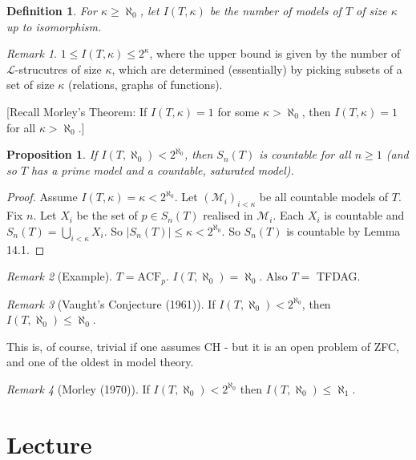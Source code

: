 \documentclass[]{article}
\theoremstyle{custhm}
\theoremstyle{cusdef}
\newtheorem{defin}[theorem]{Definition}
\theoremstyle{custhm}
\theoremstyle{custhm}
\theoremstyle{custhm}
\newtheorem{prop}[theorem]{Proposition}
\theoremstyle{ex}
\theoremstyle{custhm}
\theoremstyle{cusdef}
\theoremstyle{remark}
\newtheorem*{remark*}{Remark}
\theoremstyle{remark}
\renewcommand{\L}{\mathcal{L}}
\newcommand{\M}{\mathcal{M}}
\newcommand{\acf}{\textrm{ACF}}
\begin{document}
\begin{defin}
	For $\kappa \ge \aleph_0$, let $I(T,\kappa)$ be the number of models of $T$ of size $\kappa$ up to isomorphism.
\end{defin}
\begin{remark*}
	$1 \le I(T,\kappa) \le 2^\kappa$, where the upper bound is given by the number of $\L$-strucutres of size $\kappa$, which are determined (essentially) by picking subsets of a set of size $\kappa$ (relations, graphs of functions).

	[Recall Morley's Theorem: If $I(T,\kappa) =1 $ for some $\kappa > \aleph_0$, then $I(T,\kappa) = 1$ for all $\kappa > \aleph_0$.]
\end{remark*}
\begin{prop}
	If $I(T,\aleph_0) < 2^{\aleph_0}$, then $S_n(T)$ is countable for all $n\ge 1$ (and so $T$ has a prime model and a countable, saturated model).
\end{prop}
\begin{proof}
	Assume $I(T,\kappa) = \kappa < 2^{\aleph_0}$. Let $(\M_i)_{i<\kappa}$ be all countable models of $T$. Fix $n$. Let $X_i$ be the set of $p \in S_n(T)$ realised in $\M_i$. Each $X_i$ is countable and $S_n(T) = \bigcup_{i<\kappa}X_i$. So $|S_n(T)|\le \kappa < 2^{\aleph_0}$. So $S_n(T)$ is countable by Lemma 14.1.
\end{proof}

\begin{remark*}[Example]
	$T = \acf_p$. $I(T,\aleph_0) = \aleph_0$. Also $T = $ TFDAG.
\end{remark*}

\begin{remark*}[Vaught's Conjecture (1961)]
	If $I(T,\aleph_0) < 2^{\aleph_0}$, then $I(T,\aleph_0) \le \aleph_0$.
\end{remark*}
This is, of course, trivial if one assumes CH - but it is an open problem of ZFC, and one of the oldest in model theory.
\begin{remark*}[Morley (1970)]
	If $I(T,\aleph_0) < 2^{\aleph_0}$ then $I(T,\aleph_0)\le \aleph_1$.
\end{remark*}

\section{Lecture}
\end{document}
